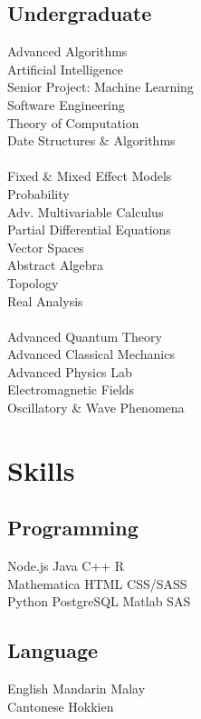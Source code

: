 \documentclass{deedy-resume-openfont}
\begin{document}
\begin{minipage}[t]{0.33\textwidth}
\subsection{Undergraduate}
Advanced Algorithms \\
Artificial Intelligence \\
Senior Project: Machine Learning \\
Software Engineering \\
Theory of Computation \\
Date Structures \& Algorithms \\
\ \\
Fixed \& Mixed Effect Models \\
Probability \\
Adv. Multivariable Calculus \\
Partial Differential Equations \\
Vector Spaces \\
Abstract Algebra \\
Topology \\
Real Analysis \\
\ \\
Advanced Quantum Theory \\
Advanced Classical Mechanics \\
Advanced Physics Lab \\
Electromagnetic Fields \\
Oscillatory \& Wave Phenomena \\

\sectionsep


\section{Skills}
\subsection{Programming}
Node.js \textbullet{} Java \textbullet{} C++ \textbullet{} R \\
Mathematica \textbullet{} HTML \textbullet{} CSS/SASS \\ 

Python \textbullet{} PostgreSQL \textbullet{} Matlab \textbullet{} SAS \\
\sectionsep

\subsection{Language}
English \textbullet{} Mandarin \textbullet{} Malay \\ 
Cantonese \textbullet{} Hokkien
\sectionsep

%
%

\end{minipage} 
\end{document}
